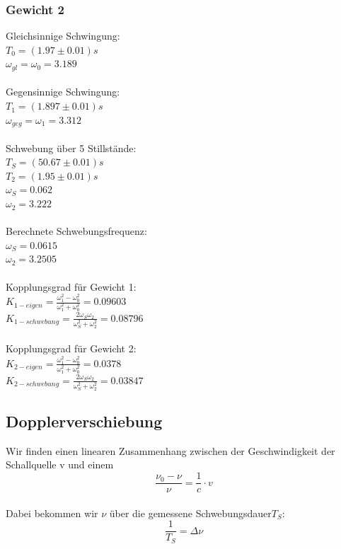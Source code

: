 \documentclass{article}
\begin{document}
\subsubsection{Gewicht 2}
Gleichsinnige Schwingung:\\
$T_0=(1.97 \pm 0.01)\si{s}$\\
$\omega_{gl}=\omega_0=3.189$\\
\\
Gegensinnige Schwingung:\\
$T_1=(1.897 \pm 0.01)\si{s}$\\
$\omega_{geg}=\omega_1=3.312$\\
\\
Schwebung über 5 Stillstände:\\
$T_S=(50.67 \pm 0.01)\si{s}$\\
$T_2=(1.95 \pm 0.01)\si{s}$\\
$\omega_S=0.062$\\
$\omega_2=3.222$\\
\\
Berechnete Schwebungsfrequenz:\\
$\omega_S=0.0615$\\
$\omega_2=3.2505$\\
\\
Kopplungsgrad für Gewicht 1:\\
$K_{1-eigen}=\frac{\omega_1^2-\omega_0^2}{\omega_1^2+\omega_0^2}=0.09603$\\
$K_{1-schwebung}=\frac{2\omega_S \omega_2}{\omega_S^2 + \omega_2^2}=0.08796$\\
\\
Kopplungsgrad für Gewicht 2:\\
$K_{2-eigen}=\frac{\omega_1^2-\omega_0^2}{\omega_1^2+\omega_0^2}=0.0378$\\
$K_{2-schwebung}=\frac{2\omega_S \omega_2}{\omega_S^2 + \omega_2^2}=0.03847$\\


\subsection{Dopplerverschiebung}
Wir finden einen linearen Zusammenhang zwischen der Geschwindigkeit der Schallquelle v und einem 
\begin{equation}
\label{frequenzlinear}
\frac{\nu_0-\nu}{\nu}=\frac{1}{c}\cdot v
\end{equation}
\\
Dabei bekommen wir $\nu$ über die gemessene Schwebungsdauer$T_S$:
\begin{equation}
\frac{1}{T_S}=\Delta \nu
\end{equation}
\end{document}
